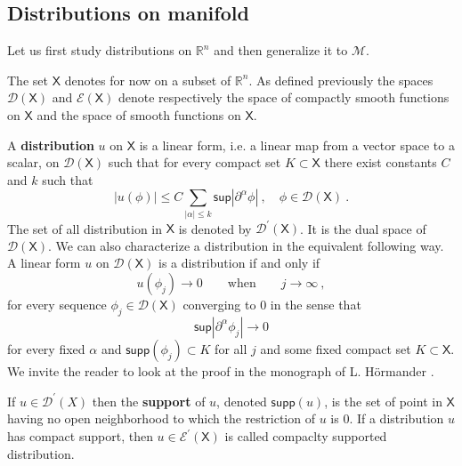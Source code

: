 \documentclass[10pt]{book}
\newcommand{\supp}{\mathsf{supp}}
\newcommand{\abs}[1]{\left|#1\right|}
\renewcommand{\sup}{\mathsf{sup}}
\newcommand{\Dcal}{\mathcal{D}}
\newcommand{\Ecal}{\mathcal{E}}
\newcommand{\Mcal}{\mathcal{M}}
\newcommand{\Rbb}{\mathbb{R}}
\newcommand{\Xsf}{\mathsf{X}}
\theoremstyle{break}
\begin{document}
\subsection{Distributions on manifold}


Let us first study distributions on $\Rbb^n$ and then generalize it to $\Mcal$. 

\bigskip


The set $\Xsf$ denotes for now on a subset of $\Rbb^n$. As defined previously the spaces $\Dcal(\Xsf)$ and $\Ecal(\Xsf)$ denote respectively the space of compactly smooth functions on $\Xsf$ and the space of smooth functions on $\Xsf$.


\bigskip


A \textbf{distribution} $u$ on $\Xsf$ is a linear form, i.e. a linear map from a vector space to a scalar, on $\Dcal(\Xsf)$ such that for every compact set $K \subset \Xsf$ there exist constants $C$ and $k$ such that
%
\begin{equation*}
\abs{u(\phi)} \leq C \sum_{\abs{\alpha} \leq k} \sup \abs{\partial^\alpha \phi} \ , \quad \phi \in \Dcal(\Xsf) \ .
\end{equation*}
%
The set of all distribution in $\Xsf$ is denoted by $\Dcal^\prime(\Xsf)$. It is the dual space of $\Dcal(\Xsf)$. We can also characterize a distribution in the equivalent following way. A linear form $u$ on $\Dcal(\Xsf)$ is a distribution if and only if 
%
\begin{equation*}
u(\phi_j) \to 0 \qquad  \mbox{when} \qquad j \to \infty \ ,
\end{equation*}
%
for every sequence $\phi_j \in \Dcal(\Xsf)$ converging to $0$ in the sense that
%
\begin{equation*}
\sup\abs{\partial^\alpha\phi_j} \to 0
\end{equation*}
%
for every fixed $\alpha$ and $\supp(\phi_j) \subset K$ for all $j$ and some fixed compact set $K \subset \Xsf$. We invite the reader to look at the proof in the monograph of L. Hörmander \cite{hormander_analysis_1990}.


\bigskip


If $u\in\Dcal^\prime(X)$ then the \textbf{support} of $u$, denoted $\supp(u)$, is the set of point in $\Xsf$ having no open neighborhood to which the restriction of $u$ is $0$. If a distribution $u$ has compact support, then $u \in \Ecal^\prime(\Xsf)$ is called compaclty supported distribution.
\end{document}
